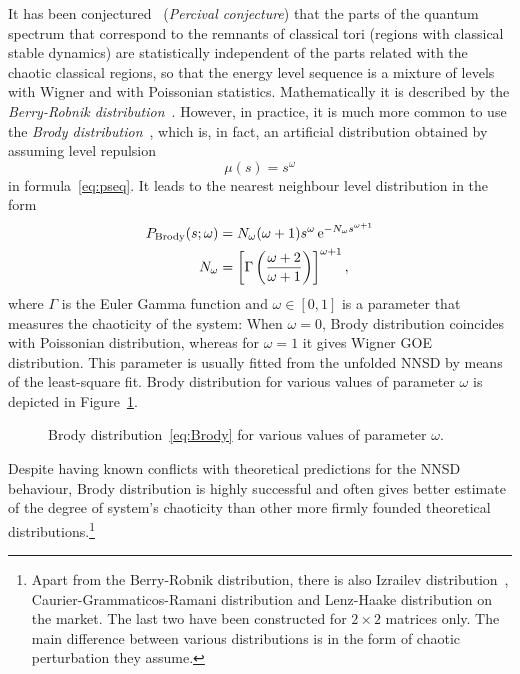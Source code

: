 \documentclass[a4paper,11pt,twoside]{article}
\begin{document}
        It has been conjectured~\cite{Per73} (\emph{Percival conjecture}) that the parts of the quantum spectrum that correspond to the remnants of classical tori (regions with classical stable dynamics) are statistically independent of the parts related with the chaotic classical regions, so that the energy level sequence is a mixture of levels with Wigner and with Poissonian statistics.
        Mathematically it is described by the \emph{Berry-Robnik distribution}~\cite{Ber84}.
        However, in practice, it is much more common to use the \emph{Brody distribution}~\cite{Bro73}, which is, in fact, an artificial distribution obtained by assuming level repulsion
        \begin{equation}
            \mu(s)=s^{\omega}
        \end{equation}
        in formula~\eqref{eq:pseq}.
        It leads to the nearest neighbour level distribution in the form
        \begin{align}
            P_{\text{Brody}}(s;\omega)
                &=N_{\omega}(\omega+1)s^{\omega}\operatorname{e}^{-N_{\omega}s^{\omega+1}}
            \label{eq:Brody}\\
            N_{\omega}
                &=\left[\Gamma\left(\frac{\omega+2}{\omega+1}\right)\right]^{\omega+1},\nonumber
        \end{align}
        where $\Gamma$ is the Euler Gamma function and $\omega\in[0,1]$ is a parameter that measures the chaoticity of the system: When $\omega=0$, Brody distribution coincides with Poissonian distribution, whereas for $\omega=1$ it gives Wigner GOE distribution.
        This parameter is usually fitted from the unfolded NNSD by means of the least-square fit.
        Brody distribution for various values of parameter $\omega$ is depicted in Figure~\ref{fig:Brody}.

        \begin{figure}[!htbp]
            \centering{}
            \caption{
                \protect\small
                Brody distribution~\eqref{eq:Brody} for various values of parameter $\omega$. 
            }	
            \label{fig:Brody}
        \end{figure}        

        Despite having known conflicts with theoretical predictions for the NNSD behaviour, Brody distribution is highly successful and often gives better estimate of the degree of system's chaoticity than other more firmly founded theoretical distributions.\footnote{
            Apart from the Berry-Robnik distribution, there is also Izrailev distribution~\cite{Izr89}, Caurier-Grammaticos-Ramani distribution and Lenz-Haake distribution on the market.
            The last two have been constructed for $2\times2$ matrices only.
            The main difference between various distributions is in the form of chaotic perturbation they assume.
        }
\end{document}
